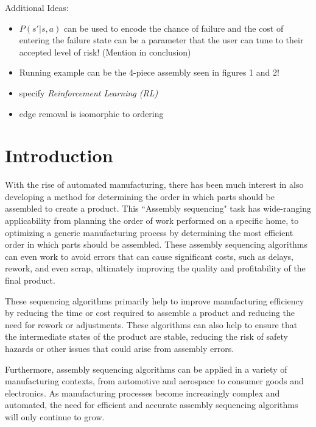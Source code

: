 \documentclass{article}
\begin{document}
Additional Ideas: 
\begin{itemize}
 \item $P(s'|s,a)$ can be used to encode the chance of failure and the cost of entering the failure state can be a parameter that the user can tune to their accepted level of risk! (Mention in conclusion)
 \item Running example can be the 4-piece assembly seen in figures 1 and 2!
 \item specify \emph{Reinforcement Learning (RL)}
 \item edge removal is isomorphic to ordering
\end{itemize}




\section{Introduction}

With the rise of automated manufacturing, there has been much interest in also developing a method for determining the order in which parts should be assembled to create a product. This ``Assembly sequencing" task has wide-ranging applicability from planning the order of work performed on a specific home, to optimizing a generic manufacturing process by determining the most efficient order in which parts should be assembled. These assembly sequencing algorithms can even work to avoid errors that can cause significant costs, such as delays, rework, and even scrap, ultimately improving the quality and profitability of the final product.



These sequencing algorithms primarily help to improve manufacturing efficiency by reducing the time or cost required to assemble a product and reducing the need for rework or adjustments. These algorithms can also help to ensure that the intermediate states of the product are stable, reducing the risk of safety hazards or other issues that could arise from assembly errors.

Furthermore, assembly sequencing algorithms can be applied in a variety of manufacturing contexts, from automotive and aerospace to consumer goods and electronics. As manufacturing processes become increasingly complex and automated, the need for efficient and accurate assembly sequencing algorithms will only continue to grow.
\end{document}
